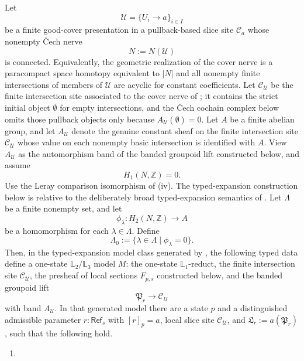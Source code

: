 \begin{theorem}\label{thm:mixed-component-construction}
Let
\[
\mathcal U=\{U_i\to a\}_{i\in I}
\]
be a finite good-cover presentation in a pullback-based slice site $\mathcal C_a$ whose nonempty \v{C}ech nerve
\[
N:=N(\mathcal U)
\]
is connected. Equivalently, the geometric realization of the cover nerve is a
paracompact space homotopy equivalent to $|N|$ and all nonempty finite
intersections of members of $\mathcal U$ are acyclic for constant
coefficients. Let $\mathcal C_{\mathcal U}$ be the finite intersection site associated to the cover nerve of
; it contains the strict
initial object $\emptyset$ for empty intersections, and the \v{C}ech
cochain complex below omits those pullback objects only because
$A_{\mathcal U}(\emptyset)=0$. Let $A$ be a finite abelian group, and let
$A_{\mathcal U}$ denote the genuine constant sheaf on the finite
intersection site $\mathcal C_{\mathcal U}$ whose value on each nonempty
basic intersection is identified with $A$. View $A_{\mathcal U}$ as the
automorphism band of the banded groupoid lift constructed below, and
assume
\[
H_1(N,\mathbb Z)=0.
\]
Use the Leray comparison isomorphism of
(iv). The typed-expansion
construction below is relative to the deliberately broad
typed-expansion semantics of
. Let $\Lambda$ be a finite nonempty set, and let
\[
\phi_\lambda:H_2(N,\mathbb Z)\to A
\]
be a homomorphism for each $\lambda\in\Lambda$. Define
\[
\Lambda_0:=\{\lambda\in\Lambda\mid \phi_\lambda=0\}.
\]
Then, in the typed-expansion model class generated by
, the following typed data
define a one-state $\mathbb L_2/\mathbb L_3$ model \(M\): the one-state
\(\mathbb L_1\)-reduct, the finite intersection site \(\mathcal C_{\mathcal U}\), the
presheaf of local sections \(F_{p,s}\) constructed below, and the banded groupoid
lift
\[
\mathfrak P_r\to \mathcal C_{\mathcal U}
\]
with band \(A_{\mathcal U}\). In that generated model there are a state
\(p\) and a distinguished admissible parameter \(r:\mathsf{Ref}_s\) with
\([r]_p=a\), local slice site \(\mathcal C_{\mathcal U}\), and
\(\mathfrak L_r:=a(\mathfrak P_r)\), such that the following hold.
\begin{enumerate}[label=(\roman*),nosep]
\item

\end{enumerate}
\end{theorem}
